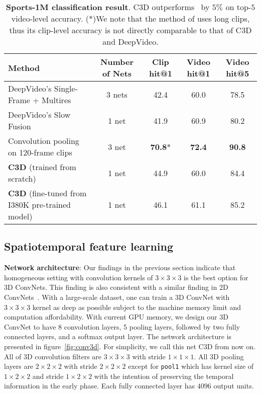 \documentclass[10pt,twocolumn,letterpaper]{article}
\begin{document}
\begin{table*}
\begin{center}

\begin{tabular}{|l|c|c|c|c|}
\hline
{\bf Method} & {\bf Number of Nets} & {\bf Clip hit@1} & {\bf Video hit@1} & {\bf Video hit@5}\\ 
\hline
DeepVideo's Single-Frame + Multires~\cite{Karpathy14} & 3 nets & 42.4 & 60.0 & 78.5 \\
DeepVideo's Slow Fusion~\cite{Karpathy14} & 1 net & 41.9 & 60.9 & 80.2 \\
Convolution pooling on 120-frame clips~\cite{Ng15} & 3 net & {\bf 70.8}* & {\bf 72.4} & {\bf 90.8}\\
{\bf C3D} (trained from scratch) & 1 net & 44.9 & 60.0 & 84.4 \\
{\bf C3D} (fine-tuned from I380K pre-trained model) & 1 net & 46.1 & 61.1 & 85.2\\
\hline
\end{tabular}
\end{center}
\vspace{-6pt}
\caption{{\bf Sports-1M classification result}. C3D outperforms~\cite{Karpathy14} by $5\%$ on top-$5$ video-level accuracy. (*)We note that the method of \cite{Ng15} uses long clips, thus its clip-level accuracy is not directly comparable to that of C3D and DeepVideo.}
\label{tab:sport1m_result}
\vspace{-6pt}
\end{table*}


\subsection{Spatiotemporal feature learning}

{\bf Network architecture}: Our findings in the previous section indicate that homogeneous setting with convolution kernels of $3 \times 3 \times 3$ is the best option for 3D ConvNets. This finding is also consistent with a similar finding in 2D ConvNets~\cite{SimonyanZ14a}. With a large-scale dataset, one can train a 3D ConvNet with $3 \times 3 \times 3$ kernel as deep as possible subject to the machine memory limit and computation affordability. With current GPU memory, we design our 3D ConvNet to have 8 convolution layers, 5 pooling layers, followed by two fully connected layers, and a softmax output layer. The network architecture is presented in figure~\ref{fig:conv3d}. For simplicity, we call this net C3D from now on. All of $3$D convolution filters are $3 \times 3 \times 3$ with stride $1 \times 1 \times 1$. All $3$D pooling layers are $2 \times 2 \times 2$ with stride $2 \times 2 \times 2$ except for \texttt{pool1} which has kernel size of $1 \times 2 \times 2$ and stride $1 \times 2 \times 2$ with the intention of preserving the temporal information in the early phase. Each fully connected layer has $4096$ output units.
\end{document}
